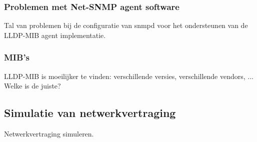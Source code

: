 \subsubsection{Problemen met Net-SNMP agent software}
Tal van problemen bij de configuratie van snmpd voor het ondersteunen van de LLDP-MIB agent implementatie.

\subsubsection{MIB's}
LLDP-MIB is moeilijker te vinden: verschillende versies, verschillende vendors, ...
Welke is de juiste?

\subsection{Simulatie van netwerkvertraging}
Netwerkvertraging simuleren.